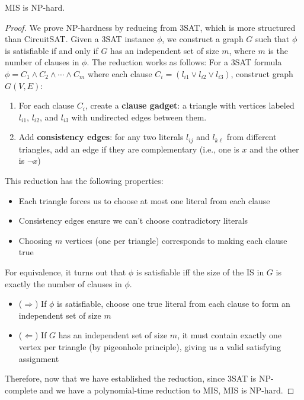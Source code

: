     \begin{theorem}
      \label{thm:maximum-independent-set-mis}
      MIS is NP-hard.
    \end{theorem}
    \begin{proof}
      We prove NP-hardness by reducing from 3SAT, which is more structured than CircuitSAT. Given a 3SAT instance $\phi$, we construct a graph $G$ such that $\phi$ is satisfiable if and only if $G$ has an independent set of size $m$, where $m$ is the number of clauses in $\phi$. The reduction works as follows: For a 3SAT formula $\phi = C_1 \land C_2 \land \cdots \land C_m$ where each clause $C_i = (l_{i1} \lor l_{i2} \lor l_{i3})$, construct graph $G(V,E)$:

      \begin{enumerate}
        \item For each clause $C_i$, create a \textbf{clause gadget}: a triangle with vertices labeled $l_{i1}$, $l_{i2}$, and $l_{i3}$ with undirected edges between them. 
        \item Add \textbf{consistency edges}: for any two literals $l_{ij}$ and $l_{k\ell}$ from different triangles, add an edge if they are complementary (i.e., one is $x$ and the other is $\neg x$)
      \end{enumerate}

      This reduction has the following properties:
      \begin{itemize}
        \item Each triangle forces us to choose at most one literal from each clause
        \item Consistency edges ensure we can't choose contradictory literals
        \item Choosing $m$ vertices (one per triangle) corresponds to making each clause true
      \end{itemize}

      For equivalence, it turns out that $\phi$ is satisfiable iff the size of the IS in $G$ is exactly the number of clauses in $\phi$. 
      \begin{itemize}
        \item ($\Rightarrow$) If $\phi$ is satisfiable, choose one true literal from each clause to form an independent set of size $m$
        \item ($\Leftarrow$) If $G$ has an independent set of size $m$, it must contain exactly one vertex per triangle (by pigeonhole principle), giving us a valid satisfying assignment
      \end{itemize}

      Therefore, now that we have established the reduction, since 3SAT is NP-complete and we have a polynomial-time reduction to MIS, MIS is NP-hard.
    \end{proof}

